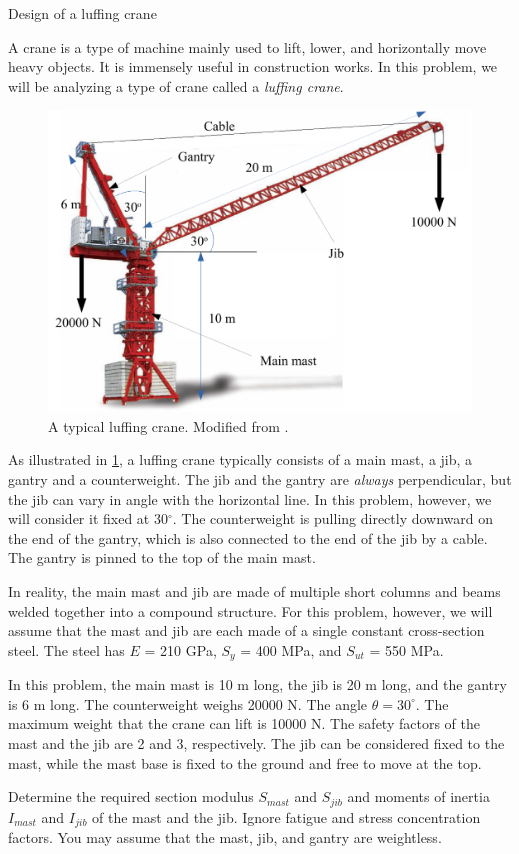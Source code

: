 \documentclass[
10pt,
a4paper,
openany,
svgnames,
]{book}
\begin{document}
\begin{example} Design of a luffing crane
  
  A crane is a type of machine mainly used to lift, lower, and horizontally move heavy objects. It is immensely useful in construction works. In this problem, we will be analyzing a type of crane called a \emph{luffing crane}.
  
  \begin{figure}[H]
    \centering
    \includegraphics[scale=0.6]{pictures/Simple-load-bearing/tower-crane2}
    \caption{A typical luffing crane. Modified from \cite{monokloncrane}.}
    \label{tower crane}
  \end{figure}
  
  As illustrated in \cref{tower crane}, a luffing crane typically consists of a main mast, a jib, a gantry and a counterweight. The jib and the gantry are \emph{always} perpendicular, but the jib can vary in angle with the horizontal line. In this problem, however, we will consider it fixed at 30$^{\circ}$. The counterweight is pulling directly downward on the end of the gantry, which is also connected to the end of the jib by a cable. The gantry is pinned to the top of the main mast.
  
  In reality, the main mast and jib are made of multiple short columns and beams welded together into a compound structure. For this problem, however, we will assume that the mast and jib are each made of a single constant cross-section steel. The steel has $E$ = 210 GPa, $S_y$ = 400 MPa, and $S_{ut}$ = 550 MPa.
  
  In this problem, the main mast is 10 m long, the jib is 20 m long, and the gantry is 6 m long. The counterweight weighs 20000 N. The angle $\theta = 30^{\circ}$. The maximum weight that the crane can lift is 10000 N. The safety factors of the mast and the jib are 2 and 3, respectively. The jib can be considered fixed to the mast, while the mast base is fixed to the ground and free to move at the top.
  
  Determine the required section modulus $S_{mast}$ and $S_{jib}$ and moments of inertia $I_{mast}$ and $I_{jib}$ of the mast and the jib. Ignore fatigue and stress concentration factors. You may assume that the mast, jib, and gantry are weightless.
  
\end{example}
\end{document}
